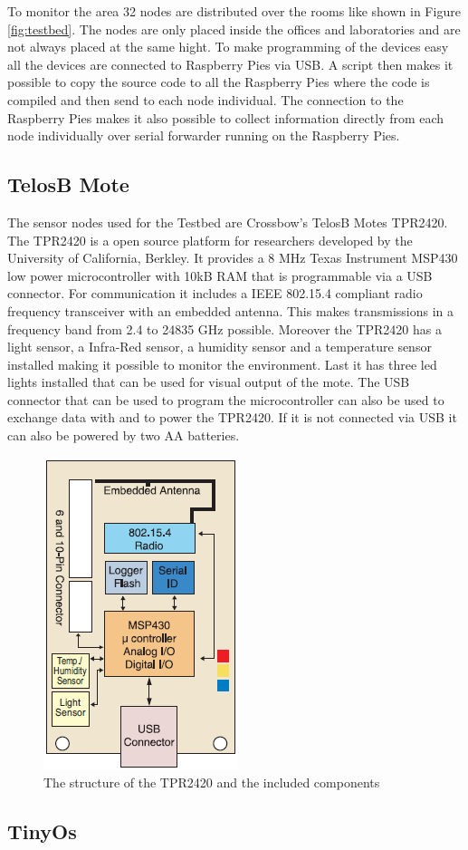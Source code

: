 To monitor the area 32 nodes are distributed over the rooms like shown in Figure \ref{fig:testbed}. The nodes are only placed inside the offices and laboratories and are not always placed at the same hight. To make programming of the devices easy all the devices are connected to Raspberry Pies via USB. A script then makes it possible to copy the source code to all the Raspberry Pies where the code is compiled and then send to each node individual. The connection to the Raspberry Pies makes it also possible to collect information directly from each node individually over serial forwarder running on the Raspberry Pies.

\subsection{TelosB Mote}
The sensor nodes used for the Testbed are Crossbow's TelosB Motes TPR2420. The TPR2420 is a open source platform for researchers developed by the University of California, Berkley. It provides a 8 MHz Texas Instrument MSP430 low power microcontroller with 10kB RAM that is programmable via a USB connector. For communication it includes a IEEE 802.15.4 compliant radio frequency transceiver with an embedded antenna. This makes transmissions in a frequency band from 2.4 to 24835 GHz possible. Moreover the TPR2420 has a light sensor, a Infra-Red sensor, a humidity sensor and a temperature sensor installed making it possible to monitor the environment. Last it has three led lights installed that can be used for visual output of the mote. The USB connector that can be used to program the microcontroller can also be used to exchange data with and to power the TPR2420. If it is not connected via USB it can also be powered by two AA batteries. \citep{telosb}

\begin{figure}[htbp]
	\centering
    \includegraphics[scale=0.7]{content/images/Mote1}
   	\caption{The structure of the TPR2420 and the included components \cite{telosb}}
    \label{fig:telosb}
\end{figure}
 
\subsection{TinyOs}




